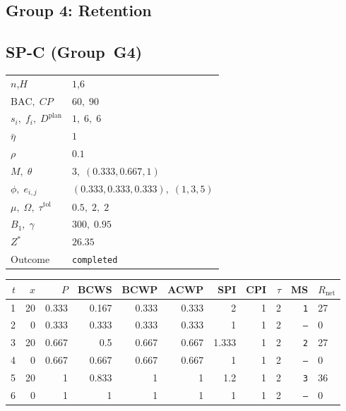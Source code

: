 \documentclass[12pt, a4paper]{article}
\newcommand{\BAC}{\mathrm{BAC}}
\begin{document}
\newpage


\subsection*{Group 4: Retention}

\subsection*{SP-C  (Group~G4)}
\begin{center}
\begin{tabular}{ll}
\toprule
$n$,\;$H$ & $1$,\;$6$ \\
$\BAC,\;CP$ & $60,\;90$ \\
$s_i,\;f_i,\;D^{\mathrm{plan}}$ & $1,\;6,\;6$ \\
$\bar\eta$ & $1$ \\
$\rho$ & $0.1$ \\
$M,\;\theta$ & $3,\;(0.333,0.667,1)$ \\
$\phi,\;e_{i,j}$ & $(0.333,0.333,0.333),\;(1,3,5)$ \\
$\mu,\;\Omega,\;\tau^{\mathrm{tol}}$ & $0.5,\;2,\;2$ \\
$B_1,\;\gamma$ & $300,\;0.95$ \\
$Z^*$ & $26.35$ \\
Outcome & \texttt{completed} \\
\bottomrule
\end{tabular}
\end{center}

\begin{center}
\begin{tabular}{rrrrrrrrrrl}
\toprule
$t$ & $x$ & $P$ & BCWS & BCWP & ACWP & SPI & CPI & $\tau$ & MS & $R_{\mathrm{net}}$\\
\midrule
1 & 20 & 0.333 & 0.167 & 0.333 & 0.333 & 2 & 1 & 2 & \texttt{1} & 27 \\
2 & 0 & 0.333 & 0.333 & 0.333 & 0.333 & 1 & 1 & 2 & \texttt{---} & 0 \\
3 & 20 & 0.667 & 0.5 & 0.667 & 0.667 & 1.333 & 1 & 2 & \texttt{2} & 27 \\
4 & 0 & 0.667 & 0.667 & 0.667 & 0.667 & 1 & 1 & 2 & \texttt{---} & 0 \\
5 & 20 & 1 & 0.833 & 1 & 1 & 1.2 & 1 & 2 & \texttt{3} & 36 \\
6 & 0 & 1 & 1 & 1 & 1 & 1 & 1 & 2 & \texttt{---} & 0 \\
\bottomrule
\end{tabular}
\end{center}
\end{document}
